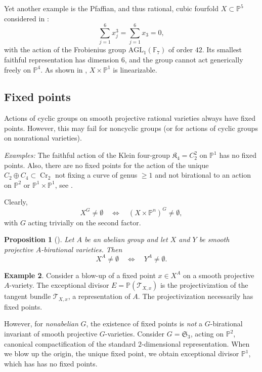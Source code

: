 \documentclass[12pt,reqno]{amsart}
\theoremstyle{plain}
\newtheorem{prop}{Proposition}[section]
\theoremstyle{remark}
\theoremstyle{definition}
\newtheorem{exam}[prop]{Example}
\numberwithin{equation}{section}
\newcommand{\bP}{{\mathbb P}}
\newcommand{\cT}{{\mathcal T}}
\newcommand{\fS}{{\mathfrak S}}
\DeclareMathOperator{\Cr}{Cr}
\begin{document}
Yet another example is the Pfaffian, and thus rational, cubic fourfold $X\subset \bP^5$ considered in \cite[Rmk. 15]{BBT}:
$$
\sum_{j=1}^6 x_j^3 = \sum_{j=1}^6 x_3 = 0,  
$$
with the action of the Frobienius group $\mathrm{AGL}_1(\mathbb F_7)$ of order $42$. Its smallest faithful representation has dimension $6$, and the group cannot act generically freely on $\bP^4$. 
As shown in \cite[Thm.\ 16]{BBT}, $X\times \bP^1$ is linearizable. 



\subsection{Fixed points}
\label{sect:fix}

Actions of cyclic groups on smooth projective rational varieties always have fixed points. However, this may fail for noncyclic groups (or for actions of cyclic groups on nonrational varieties). 

\medskip
\noindent
\emph{Examples:} The faithful action of the Klein four-group $\mathfrak K_4=C_2^2$ on $\bP^1$ has no fixed points.
Also, there are no fixed points for the action of the unique $C_2\oplus C_4\subset \Cr_2$ not fixing a curve of genus $\ge 1$ and not birational to an action on $\bP^2$ or $\bP^1\times \bP^1$, see \cite[Thm.\ 5]{blanc-thesis}.  

\medskip

Clearly, 
$$
X^G\neq \emptyset \quad \Leftrightarrow\quad (X\times \bP^n)^G\neq \emptyset,
$$
with $G$ acting trivially on the second factor. 


\begin{prop}[{\cite{RYessential}}]
\label{prop:point}
Let $A$ be an abelian group and 
let $X$ and $Y$ be smooth projective $A$-birational varieties. 
Then 
$$
X^A\neq \emptyset \quad\Leftrightarrow\quad Y^A\neq \emptyset.
$$
\end{prop}



\begin{exam}
Consider a blow-up of a fixed point $x\in X^A$ on a smooth projective $A$-variety. The exceptional divisor $E=\bP(\cT_{X,x})$ is the projectivization of the tangent bundle $\cT_{X,x}$, a representation of $A$. The projectivization necessarily has fixed points.  

However, for {\em nonabelian} $G$,
the existence of fixed points is {\em not} a $G$-birational invariant of smooth projective $G$-varieties.
Consider $G=\fS_3$, acting on $\bP^2$, canonical compactification of the standard $2$-dimensional representation.
When we blow up the origin, the unique fixed point, we obtain
exceptional divisor $\bP^1$, which has has no fixed points. 
\end{exam}
\end{document}
